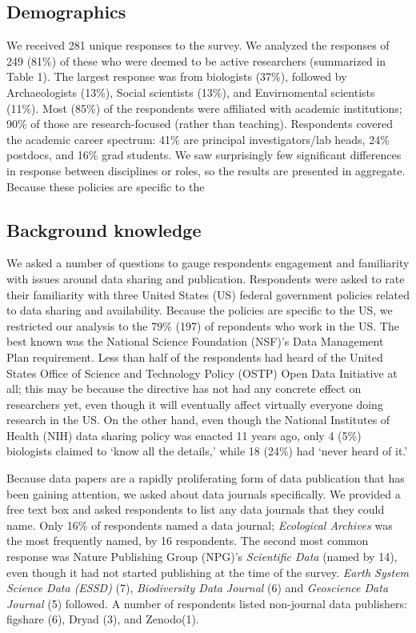 \documentclass[10pt]{article}
\begin{document}
\subsection*{Demographics}
We received 281 unique responses to the survey.
We analyzed the responses of 249 (81\%) of these who were deemed to be active researchers (summarized in Table 1).
The largest response was from biologists (37\%), followed by Archaeologists (13\%), Social scientists (13\%), and Envirnomental scientists (11\%).
Most (85\%) of the respondents were affiliated with academic institutions; 90\% of those are research-focused (rather than teaching).
Respondents covered the academic career spectrum: 41\% are principal investigators/lab heads, 24\% postdocs, and 16\% grad students.
We saw surprisingly few significant differences in response between disciplines or roles, so the results are presented in aggregate.
Because these policies are specific to the 

\subsection*{Background knowledge}

We asked a number of questions to gauge respondents engagement and familiarity with issues around data sharing and publication.
Respondents were asked to rate their familiarity with three United States (US) federal government policies related to data sharing and availability.
Because the policies are specific to the US, we restricted our analysis to the 79\% (197) of repondents who work in the US.
The best known was the National Science Foundation (NSF)'s Data Management Plan requirement\cite{national_science_foundation_gpg_2011}.
Less than half of the respondents had heard of the United States Office of Science and Technology Policy (OSTP) Open Data Initiative\cite{obama_making_2013} at all; this may be because the directive has not had any concrete effect on researchers yet, even though it will eventually affect virtually everyone doing research in the US.
On the other hand, even though the National Institutes of Health (NIH) data sharing policy\cite{national_institutes_of_health_final_2003} was enacted 11 years ago, only 4 (5\%) biologists claimed to `know all the details,' while 18 (24\%) had `never heard of it.'

Because data papers are a rapidly proliferating form of data publication that has been gaining attention, we asked about data journals specifically.
We provided a free text box and asked respondents to list any data journals that they could name.
Only 16\% of respondents named a data journal; \emph{Ecological Archives} was the most frequently named, by 16 respondents. 
The second most common response was Nature Publishing Group (NPG)'s \emph{Scientific Data} (named by 14), even though it had not started publishing at the time of the survey.
\emph{Earth System Science Data (ESSD)} (7), \emph{Biodiversity Data Journal} (6) and \emph{Geoscience Data Journal} (5) followed.
A number of respondents listed non-journal data publishers: figshare (6), Dryad (3), and Zenodo(1).
\end{document}
